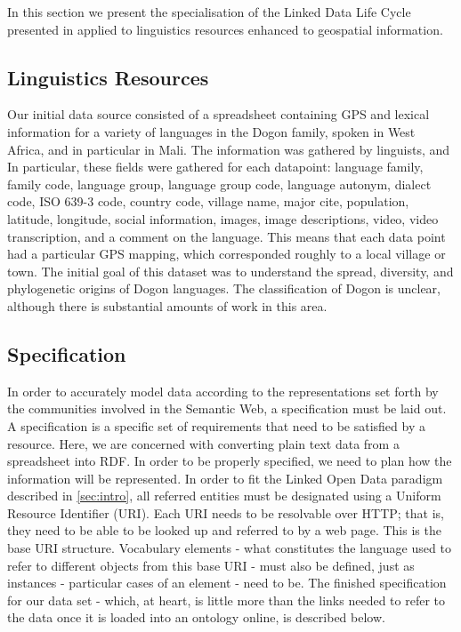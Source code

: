 In this section we present the specialisation of the Linked Data Life Cycle presented in \cite{Villazon_2011} applied to linguistics resources enhanced to geospatial information.

\subsection{Linguistics Resources}\label{sec:lr}

Our initial data source consisted of a spreadsheet containing GPS and lexical information for a variety of languages in the Dogon family, spoken in West Africa, and in particular in Mali. The information was gathered by linguists, and %
In particular, these fields were gathered for each datapoint: language family, family code, language group, language group code, language autonym, dialect code, ISO 639-3 code, country code, village name, major cite, population, latitude, longitude, social information, images, image descriptions, video, video transcription, and a comment on the language. This means that each data point had a particular GPS mapping, which corresponded roughly to a local village or town. The initial goal of this dataset was to understand the spread, diversity, and phylogenetic origins of Dogon languages. The classification of Dogon is unclear, although there is substantial amounts of work in this area. 



\subsection{Specification}
In order to accurately model data according to the representations set forth by the communities involved in the Semantic Web, a specification must be laid out. A specification is a specific set of requirements that need to be satisfied by a resource. Here, we are concerned with converting plain text data from a spreadsheet into RDF. In order to be properly specified, we need to plan how the information will be represented. In order to fit the Linked Open Data paradigm described in \ref{sec:intro}, all referred entities must be designated using a Uniform Resource Identifier (URI). Each URI needs to be resolvable over HTTP; that is, they need to be able to be looked up and referred to by a web page. This is the base URI structure. Vocabulary elements - what constitutes the language used to refer to different objects from this base URI - must also be defined, just as instances - particular cases of an element - need to be. The finished specification for our data set - which, at heart, is little more than the links needed to refer to the data once it is loaded into an ontology online, is described below. 

